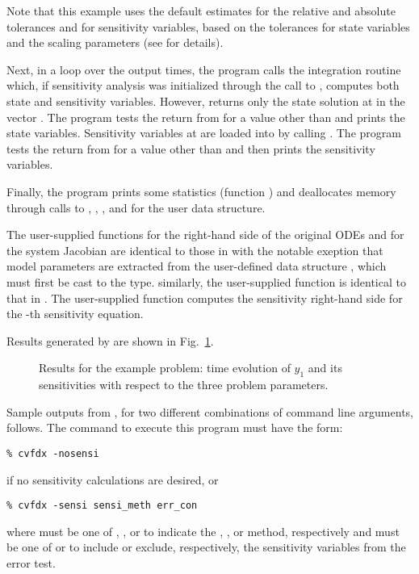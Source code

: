 Note that this example uses the default estimates for the relative and absolute tolerances 
 and  for sensitivity variables, based on the tolerances for state 
variables and the scaling parameters  (see  for details).

Next, in a loop over the  output times, the program calls the integration
routine  which, if sensitivity analysis was initialized through the call
to , computes both state and sensitivity variables. However,
 returns only the state solution at  in the vector .
The program tests the return from  for a value other than  and
prints the state variables.
Sensitivity variables at  are loaded into  by calling .
The program tests the return from  for a value other than  
and then prints the sensitivity variables.

Finally, the program prints some statistics (function ) 
and deallocates memory through calls
to , , 
, and  for the user data structure.

The user-supplied functions  for the right-hand side of the original ODEs and
 for the system Jacobian are identical to those in  with the 
notable exeption that model parameters are extracted from the user-defined data structure
, which must first be cast to the  type. similarly, the
user-supplied function  is identical to that in .
The user-supplied function  computes the sensitivity right-hand side for the -th 
sensitivity equation.

Results generated by  are shown in Fig.~\ref{f:cvfdx}. 
\begin{figure}
  {\centerline{}}
  \caption{Results for the  example problem:
    time evolution of $y_1$ and its sensitivities with respect to the
    three problem parameters.}
  \label{f:cvfdx}
\end{figure}
Sample outputs from , for two different combinations of command line arguments, 
follows. The command to execute this program must have the form:
\begin{verbatim}
% cvfdx -nosensi
\end{verbatim} 
if no sensitivity calculations are desired, or
\begin{verbatim}
% cvfdx -sensi sensi_meth err_con
\end{verbatim}
where  must be one of , , or  to
indicate the , , or  method,
respectively and  must be one of  or  to
include or exclude, respectively, the sensitivity variables from the error test.

